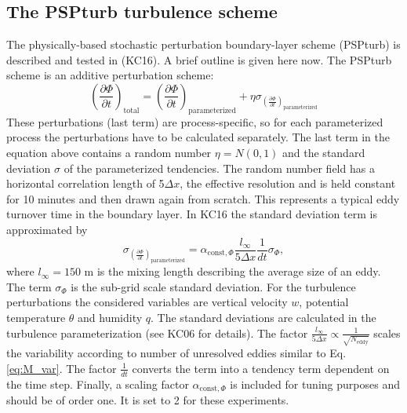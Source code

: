 \documentclass[a4paper, 12pt]{article}
\begin{document}
\subsection{The PSPturb turbulence scheme}
The physically-based stochastic perturbation boundary-layer scheme (PSPturb) is described and tested in \cite{Kober2016}(KC16). A brief outline is given here now. The PSPturb scheme is an additive perturbation scheme:
\begin{equation} \label{eq:PSPturb_additive}
\left( \frac{\partial \Phi}{\partial t} \right)_{\mathrm{total}} = \left( \frac{\partial \Phi}{\partial t} \right)_{\mathrm{parameterized}} + \eta \sigma_{\left( \frac{\partial \Phi}{\partial t} \right)_{\mathrm{parameterized}}}
\end{equation}
These perturbations (last term) are process-specific, so for each parameterized process the perturbations have to be calculated separately. The last term in the equation above contains a random number $\eta = \mathit{N}(0,1)$ and the standard deviation $\sigma$ of the parameterized tendencies. The random number field has a horizontal correlation length of 5$\Delta x$, the effective resolution and is held constant for 10 minutes and then drawn again from scratch. This represents a typical eddy turnover time in the boundary layer. In KC16 the standard deviation term is approximated by
\begin{equation} \label{eq:PSPturb_std}
\sigma_{\left( \frac{\partial \Phi}{\partial t} \right)_{\mathrm{parameterized}}} = \alpha_{\mathrm{const}, \Phi} \frac{\mathit{l_{\infty}}}{5 \Delta x}\frac{1}{dt} \sigma_{\Phi},
\end{equation}
where $\mathit{l_{\infty}} = 150$ m is the mixing length describing the average size of an eddy. The term $\sigma_{\Phi}$ is the sub-grid scale standard deviation. For the turbulence perturbations the considered variables are vertical velocity $w$, potential temperature $\theta$ and humidity $q$. The standard deviations are calculated in the turbulence parameterization (see KC06 for details). The factor $\frac{\mathit{l_{\infty}}}{5 \Delta x} \propto \frac{1}{\sqrt{N_{\mathrm{eddy}}}}$ scales the variability according to number of unresolved eddies similar to Eq. \ref{eq:M_var}. The factor $\frac{1}{dt}$  converts the term into a tendency term dependent on the time step. Finally, a scaling factor $\alpha_{\mathrm{const}, \Phi}$ is included for tuning purposes and should be of order one. It is set to 2 for these experiments. 
\end{document}
